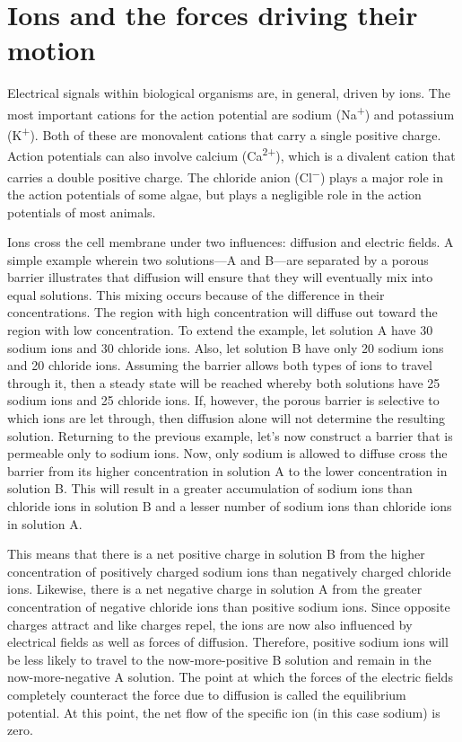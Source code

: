 \documentclass[]{book}
\begin{document}
\hypertarget{ions-and-the-forces-driving-their-motion}{%
\section{Ions and the forces driving their motion}\label{ions-and-the-forces-driving-their-motion}}

Electrical signals within biological organisms are, in general, driven by ions. The most important cations for the action potential are sodium (Na\textsuperscript{+}) and potassium (K\textsuperscript{+}). Both of these are monovalent cations that carry a single positive charge. Action potentials can also involve calcium (Ca\textsuperscript{2+}), which is a divalent cation that carries a double positive charge. The chloride anion (Cl\textsuperscript{−}) plays a major role in the action potentials of some algae, but plays a negligible role in the action potentials of most animals.

Ions cross the cell membrane under two influences: diffusion and electric fields. A simple example wherein two solutions---A and B---are separated by a porous barrier illustrates that diffusion will ensure that they will eventually mix into equal solutions. This mixing occurs because of the difference in their concentrations. The region with high concentration will diffuse out toward the region with low concentration. To extend the example, let solution A have 30 sodium ions and 30 chloride ions. Also, let solution B have only 20 sodium ions and 20 chloride ions. Assuming the barrier allows both types of ions to travel through it, then a steady state will be reached whereby both solutions have 25 sodium ions and 25 chloride ions. If, however, the porous barrier is selective to which ions are let through, then diffusion alone will not determine the resulting solution. Returning to the previous example, let's now construct a barrier that is permeable only to sodium ions. Now, only sodium is allowed to diffuse cross the barrier from its higher concentration in solution A to the lower concentration in solution B. This will result in a greater accumulation of sodium ions than chloride ions in solution B and a lesser number of sodium ions than chloride ions in solution A.

This means that there is a net positive charge in solution B from the higher concentration of positively charged sodium ions than negatively charged chloride ions. Likewise, there is a net negative charge in solution A from the greater concentration of negative chloride ions than positive sodium ions. Since opposite charges attract and like charges repel, the ions are now also influenced by electrical fields as well as forces of diffusion. Therefore, positive sodium ions will be less likely to travel to the now-more-positive B solution and remain in the now-more-negative A solution. The point at which the forces of the electric fields completely counteract the force due to diffusion is called the equilibrium potential. At this point, the net flow of the specific ion (in this case sodium) is zero.
\end{document}
